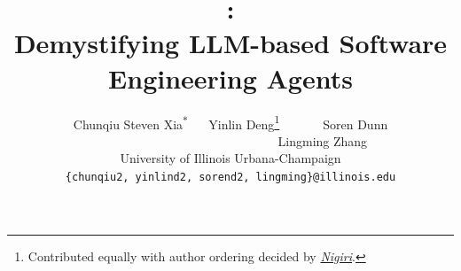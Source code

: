 \documentclass{article} %
\begin{document}
\frenchspacing %



\title{\tech{} \cat{}:\\
Demystifying LLM-based Software Engineering Agents}


\newcommand{\seperate}{{\ \ \ \ \ \ \ \ \ \ \ \ \ \ \ \ \ \ \ \ \ \ \ \ \ \ \ \ \ }}
\newcommand{\sseparate}{{\ \ }}

\author{Chunqiu Steven Xia\textsuperscript{$*$} 
\sseparate
Yinlin Deng\thanks{Contributed equally with author ordering decided by \href{https://senseis.xmp.net/?Nigiri}{\textit{Nigiri}}.}
\sseparate
\sseparate
\
Soren Dunn
\seperate
Lingming Zhang
\\[\bigskipamount]
University of Illinois Urbana-Champaign{ }\uiuc{}
\\[\bigskipamount]
\texttt{\{chunqiu2, yinlind2, sorend2, lingming\}@illinois.edu}
}



\maketitle
\end{document}
